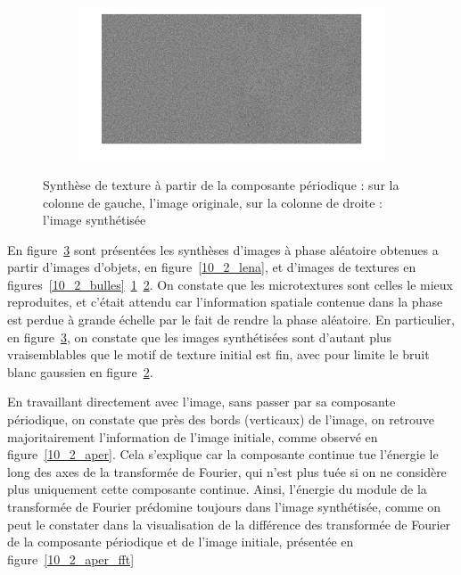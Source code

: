 \documentclass[12pt,a4paper,onecolumn]{article}
\begin{document}
\begin{figure}[H]
\begin{subfigure}[b]{\textwidth}
		\label{10_2_tissu}
	\end{subfigure}
	\begin{subfigure}[b]{\textwidth}
		\centering
		\includegraphics[height = 0.20\textheight]{10_2_noise}
		\label{10_2_noise}
	\end{subfigure}
	\caption{Synthèse de texture à partir de la composante périodique : sur la colonne de gauche, l'image originale, sur la colonne de droite : l'image synthétisée}
	\label{10_2_textures}
\end{figure}

En figure~\ref{10_2_textures} sont présentées les synthèses d'images à phase aléatoire obtenues a partir d'images d'objets, en figure~\ref{10_2_lena}, et d'images de textures en figures~\ref{10_2_bulles}~\ref{10_2_tissu}~\ref{10_2_noise}. On constate que les microtextures sont celles le mieux reproduites, et c'était attendu car l'information spatiale contenue dans la phase est perdue à grande échelle par le fait de rendre la phase aléatoire. En particulier, en figure~\ref{10_2_textures}, on constate que les images synthétisées sont d'autant plus vraisemblables que le motif de texture initial est fin, avec pour limite le bruit blanc gaussien en figure~\ref{10_2_noise}.

En travaillant directement avec l'image, sans passer par sa composante périodique, on constate que près des bords (verticaux) de l'image, on retrouve majoritairement l'information de l'image initiale, comme observé en figure~\ref{10_2_aper}. Cela s'explique car la composante continue tue l'énergie le long des axes de la transformée de Fourier, qui n'est plus tuée si on ne considère plus uniquement cette composante continue. Ainsi, l'énergie du module de la transformée de Fourier prédomine toujours dans l'image synthétisée, comme on peut le constater dans la visualisation de la différence des transformée de Fourier de la composante périodique et de l'image initiale, présentée en figure~\ref{10_2_aper_fft}
\end{document}
